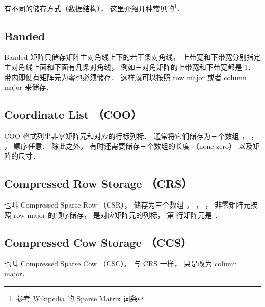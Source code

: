 
有不同的储存方式（数据结构）， 这里介绍几种常见的\footnote{参考 Wikipedia 的 Sparse Matrix 词条}．

\subsection{Banded}
Banded 矩阵只储存矩阵主对角线上下的若干条对角线， 上带宽和下带宽分别指定主对角线上面和下面有几条对角线， 例如三对角矩阵的上带宽和下带宽都是 1． 带内即使有矩阵元为零也必须储存． 这样就可以按照 row major 或者 column major 来储存．

\subsection{Coordinate List （COO）}
COO 格式列出非零矩阵元和对应的行标列标． 通常将它们储存为三个数组 ， ， ， 顺序任意． 除此之外， 有时还需要储存三个数组的长度  （none zero） 以及矩阵的尺寸．

\subsection{Compressed Row Storage （CRS）}
也叫 Compressed Sparse Row （CSR）， 储存为三个数组 ， ， ， 非零矩阵元按照 row major 的顺序储存，  是对应矩阵元的列标， 第  行矩阵元是 ．

\subsection{Compressed Cow Storage （CCS）}
也叫 Compressed Sparse Cow （CSC）， 与 CRS 一样， 只是改为 column major．
